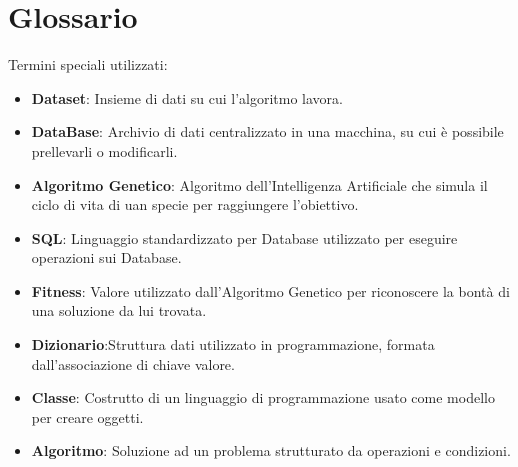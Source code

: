 \documentclass{article}
\begin{document}
\section{Glossario}

\begin{itemize}
\begin{itemize}
Termini speciali utilizzati:
\end{itemize}
\begin{itemize}
\item\textbf{Dataset}: Insieme di dati su cui l'algoritmo lavora.
\end{itemize}
\begin{itemize}
\item\textbf{DataBase}: Archivio di dati centralizzato in una macchina, su cui è possibile prellevarli o modificarli.
\end{itemize}
\begin{itemize}
\item\textbf{Algoritmo Genetico}: Algoritmo dell'Intelligenza Artificiale che simula il ciclo di vita di uan specie per raggiungere l'obiettivo.
\end{itemize}
\begin{itemize}
\item\textbf{SQL}: Linguaggio standardizzato per Database utilizzato per eseguire operazioni sui Database.
\end{itemize}
\begin{itemize}
\item\textbf{Fitness}: Valore utilizzato dall'Algoritmo Genetico per riconoscere la bontà di una soluzione da lui trovata.
\end{itemize}
\begin{itemize}
\item\textbf{Dizionario}:Struttura dati utilizzato in programmazione, formata dall'associazione di chiave valore.
\end{itemize}
\begin{itemize}
\item\textbf{Classe}: Costrutto di un linguaggio di programmazione usato come modello per creare oggetti.
\end{itemize}
\begin{itemize}
\item\textbf{Algoritmo}: Soluzione ad un problema strutturato da operazioni e condizioni.
\end{itemize}
\end{itemize}

\printindex
\end{document}

